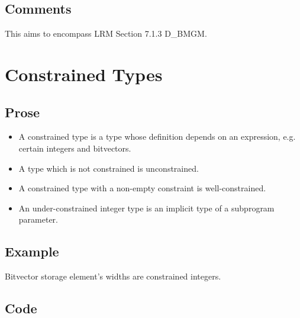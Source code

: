 \documentclass{book}
\begin{document}
\begin{comment}
ROMAN: Shouldn't we define the domain of tuples, records, arrays, etc. ?

ROMAN: Should we formalize static evaluation of constraints?
\end{comment}

  \subsection{Comments}
  This aims to encompass LRM Section 7.1.3 D\_BMGM.

\section{Constrained Types}

\subsection{Prose}
  \begin{itemize}
  \item A constrained type is a type whose definition depends on an expression, e.g. certain integers and bitvectors. 
  \item A type which is not constrained is unconstrained.
  \item A constrained type with a non-empty constraint is well-constrained.
  \item An under-constrained integer type is an implicit type of a subprogram parameter.
  \end{itemize}

  \subsection{Example}
    Bitvector storage element’s widths are constrained integers.  

  \subsection{Code}
\end{document}
